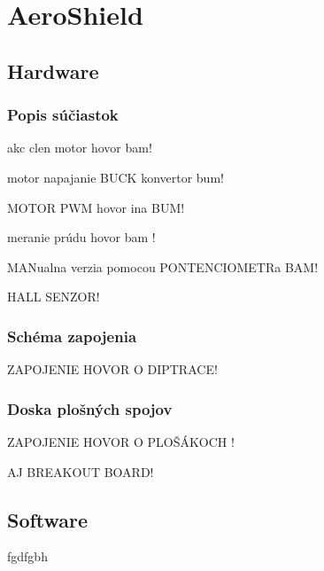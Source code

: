 \chapter{AeroShield}

\section{Hardware}
\subsection{Popis súčiastok}

akc clen motor hovor bam! 

motor napajanie BUCK konvertor bum! 

MOTOR PWM hovor ina BUM! 

meranie prúdu hovor bam ! 

MANualna verzia pomocou PONTENCIOMETRa BAM! 

HALL SENZOR! 

\subsection{Schéma zapojenia}

ZAPOJENIE HOVOR O DIPTRACE! 

\subsection{Doska plošných spojov}

ZAPOJENIE HOVOR O PLOŠÁKOCH ! 

AJ BREAKOUT BOARD! 

\section{Software}
fgdfgbh 